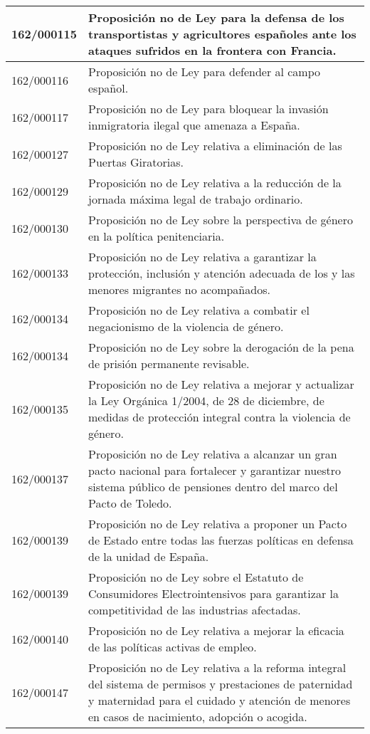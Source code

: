{\begin{table}[H]
\begin{center}
\begin{tabularx}{\linewidth}{| l | X |}
\hline
162/000115 & Proposición no de Ley para la defensa de los transportistas y agricultores españoles ante los ataques sufridos en la frontera con Francia. \\
\hline
162/000116 & Proposición no de Ley para defender al campo español. \\
\hline
162/000117 & Proposición no de Ley para bloquear la invasión inmigratoria ilegal que amenaza a España. \\
\hline
162/000127 & Proposición no de Ley relativa a eliminación de las Puertas Giratorias. \\
\hline
162/000129 & Proposición no de Ley relativa a la reducción de la jornada máxima legal de trabajo ordinario. \\
\hline
162/000130 & Proposición no de Ley sobre la perspectiva de género en la política penitenciaria. \\
\hline
162/000133 & Proposición no de Ley relativa a garantizar la protección, inclusión y atención adecuada de los y las menores migrantes no acompañados. \\
\hline
162/000134 & Proposición no de Ley relativa a combatir el negacionismo de la violencia de género. \\
\hline
162/000134 & Proposición no de Ley sobre la derogación de la pena de prisión permanente revisable. \\
\hline
162/000135 & Proposición no de Ley relativa a mejorar y actualizar la Ley Orgánica 1/2004, de 28 de diciembre, de medidas de protección integral contra la violencia de género. \\
\hline
162/000137 & Proposición no de Ley relativa a alcanzar un gran pacto nacional para fortalecer y garantizar nuestro sistema público de pensiones dentro del marco del Pacto de Toledo. \\
\hline
162/000139 & Proposición no de Ley relativa a proponer un Pacto de Estado entre todas las fuerzas políticas en defensa de la unidad de España. \\
\hline
162/000139 & Proposición no de Ley sobre el Estatuto de Consumidores Electrointensivos para garantizar la competitividad de las industrias afectadas. \\
\hline
162/000140 & Proposición no de Ley relativa a mejorar la eficacia de las políticas activas de empleo. \\
\hline
162/000147 & Proposición no de Ley relativa a la reforma integral del sistema de permisos y prestaciones de paternidad y maternidad para el cuidado y atención de menores en casos de nacimiento, adopción o acogida. \\

\end{tabularx}
\end{center}
\end{table}}
